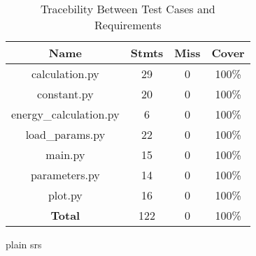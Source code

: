 \documentclass[12pt, titlepage]{article}
\begin{document}
\begin{table}[h!]
\begin{center}
\begin{tabular}{ c|c|c|c }
\hline
 \textbf{Name} &  \textbf{Stmts} &  \textbf{Miss} &  \textbf{Cover}\\ 
\hline

    calculation.py & 29 & 0 & 100\% \\ 
    \hline
    constant.py & 20 & 0 & 100\% \\ 
    \hline
    energy\_calculation.py & 6 & 0 & 100\% \\ 
    \hline
    load\_params.py  & 22 & 0 & 100\% \\ 
    \hline
    main.py  & 15 & 0 & 100\% \\ 
    \hline
    parameters.py & 14 & 0 & 100\% \\ 
    \hline
    plot.py & 16 & 0 & 100\% \\ 
    \hline
    \textbf{Total} & 122 & 0 & 100\% \\ 
 
\hline
\end{tabular}

\caption{Tracebility Between Test Cases and Requirements}
\label{tab:code-coverage-metrics}
\end{center}
\end{table}

\newpage
 {plain}
 {srs}
\end{document}

